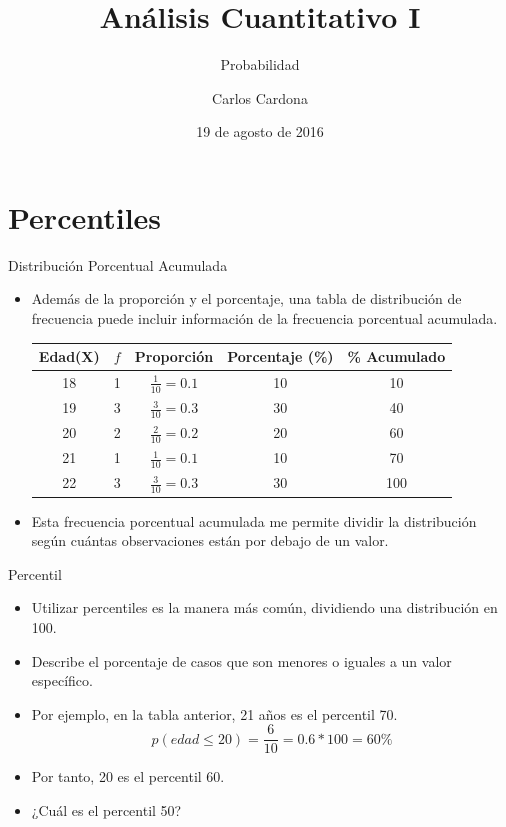 \documentclass[xcolor=dvipsnames]{beamer}
\author[Carlos Cardona]{Carlos Cardona}
\title{Análisis Cuantitativo I}
\subtitle{Probabilidad}
\institute[URosario]{Universidad del Rosario}
\date{19 de agosto de 2016}
\begin{document}
\maketitle

\section{Percentiles}
\begin{frame}{Distribución Porcentual Acumulada}
\begin{itemize}
\justifying
\item Además de la proporción y el porcentaje, una tabla de distribución de frecuencia puede incluir información de la frecuencia porcentual acumulada.
\begin{center}
\begin{table}[H]
\begin{tabular}{ccccc} \hline
Edad(X) & $f$ & Proporción & Porcentaje (\%) & \% Acumulado \\ \hline
18 &1& $\frac{1}{10}=0.1$ & 10 & 10 \\
19 &3 & $\frac{3}{10}=0.3$ &30 &40 \\
20 &2 & $\frac{2}{10}=0.2$ &20 &60 \\
21 &1 & $\frac{1}{10}=0.1$ &10 &70 \\
22 &3 & $\frac{3}{10}=0.3$ &30 &100 \\ \hline
\end{tabular}
\end{table}
\end{center}
\item Esta frecuencia porcentual acumulada me permite dividir la distribución según cuántas observaciones están por debajo de un valor.
\end{itemize}
\end{frame}

\begin{frame}{Percentil}
\begin{itemize}
\justifying
\item Utilizar percentiles es la manera más común, dividiendo una distribución en 100.
\item Describe el porcentaje de casos que son menores o iguales a un valor específico.
\item Por ejemplo, en la tabla anterior, 21 años es el percentil 70. 
$$p(edad\leq20)=\dfrac{6}{10}=0.6*100=60\%$$
\item Por tanto, 20 es el percentil 60.
\item ¿Cuál es el percentil 50?
\end{itemize}
\end{frame}
\end{document}
